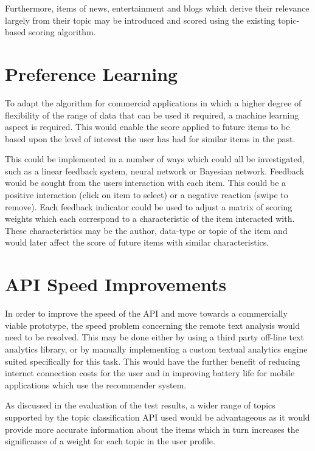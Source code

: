 Furthermore, items of news, entertainment and blogs which derive their relevance largely from their topic may be introduced and scored using the existing topic-based scoring algorithm. 

\section{Preference Learning}

To adapt the algorithm for commercial applications in which a higher degree of flexibility of the range of data that can be used it required, a machine learning aspect is required. This would enable the score applied to future items to be based upon the level of interest the user has had for similar items in the past. 

This could be implemented in a number of ways which could all be investigated, such as a linear feedback system, neural network or Bayesian network. Feedback would be sought from the users interaction with each item. This could be a positive interaction (click on item to select) or a negative reaction (swipe to remove). Each feedback indicator could be used to adjust a matrix of scoring weights which each correspond to a characteristic of the item interacted with. These characteristics may be the author, data-type or topic of the item and would later affect the score of future items with similar characteristics.  

\section{API Speed Improvements}

In order to improve the speed of the API and move towards a commercially viable prototype, the speed problem concerning the remote text analysis would need to be resolved. This may be done either by using a third party off-line text analytics library, or by manually implementing a custom textual analytics engine suited specifically for this task. This would have the further benefit of reducing internet connection costs for the user and in improving battery life for mobile applications which use the recommender system. 

As discussed in the evaluation of the test results, a wider range of topics supported by the topic classification API used would be advantageous as it would provide more accurate information about the items which in turn increases the significance of a weight for each topic in the user profile. 